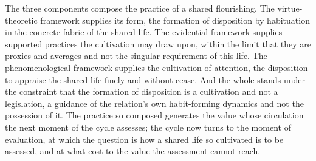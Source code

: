The three components compose the practice of a shared flourishing. The virtue-theoretic framework supplies its form, the formation of disposition by habituation in the concrete fabric of the shared life. The evidential framework supplies supported practices the cultivation may draw upon, within the limit that they are proxies and averages and not the singular requirement of this life. The phenomenological framework supplies the cultivation of attention, the disposition to appraise the shared life finely and without cease. And the whole stands under the constraint that the formation of disposition is a cultivation and not a legislation, a guidance of the relation's own habit-forming dynamics and not the possession of it. The practice so composed generates the value whose circulation the next moment of the cycle assesses; the cycle now turns to the moment of evaluation, at which the question is how a shared life so cultivated is to be assessed, and at what cost to the value the assessment cannot reach.
